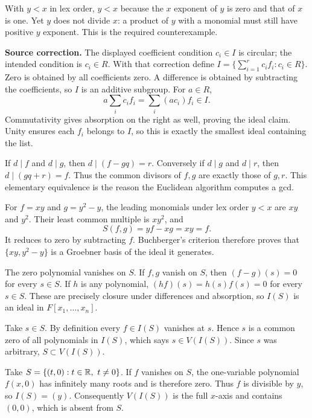 With $y<x$ in lex order, $y<x$ because the $x$ exponent of $y$ is zero and that of $x$ is one. Yet $y$ does not divide $x$: a product of $y$ with a monomial must still have positive $y$ exponent. This is the required counterexample.

\textbf{Source correction.} The displayed coefficient condition $c_i\in I$ is circular; the intended condition is $c_i\in R$. With that correction define $I=\{\sum_{i=1}^r c_if_i:c_i\in R\}$.
Zero is obtained by all coefficients zero. A difference is obtained by subtracting the coefficients, so $I$ is an additive subgroup. For $a\in R$,
\[a\sum_i c_if_i=\sum_i(ac_i)f_i\in I.\]
Commutativity gives absorption on the right as well, proving the ideal claim. Unity ensures each $f_i$ belongs to $I$, so this is exactly the smallest ideal containing the list.

If $d\mid f$ and $d\mid g$, then $d\mid(f-gq)=r$. Conversely if $d\mid g$ and $d\mid r$, then $d\mid(gq+r)=f$. Thus the common divisors of $f,g$ are exactly those of $g,r$. This elementary equivalence is the reason the Euclidean algorithm computes a gcd.

For $f=xy$ and $g=y^2-y$, the leading monomials under lex order $y<x$ are $xy$ and $y^2$. Their least common multiple is $xy^2$, and
\[S(f,g)=yf-xg=xy=f.\]
It reduces to zero by subtracting $f$. Buchberger's criterion therefore proves that $\{xy,y^2-y\}$ is a Groebner basis of the ideal it generates.

The zero polynomial vanishes on $S$. If $f,g$ vanish on $S$, then $(f-g)(s)=0$ for every $s\in S$. If $h$ is any polynomial, $(hf)(s)=h(s)f(s)=0$ for every $s\in S$. These are precisely closure under differences and absorption, so $I(S)$ is an ideal in $F[x_1,\ldots,x_n]$.

Take $s\in S$. By definition every $f\in I(S)$ vanishes at $s$. Hence $s$ is a common zero of all polynomials in $I(S)$, which says $s\in V(I(S))$. Since $s$ was arbitrary, $S\subset V(I(S))$.

Take $S=\{(t,0):t\in\mathbb{R},\ t\ne0\}$. If $f$ vanishes on $S$, the one-variable polynomial $f(x,0)$ has infinitely many roots and is therefore zero. Thus $f$ is divisible by $y$, so $I(S)=(y)$. Consequently $V(I(S))$ is the full $x$-axis and contains $(0,0)$, which is absent from $S$.

